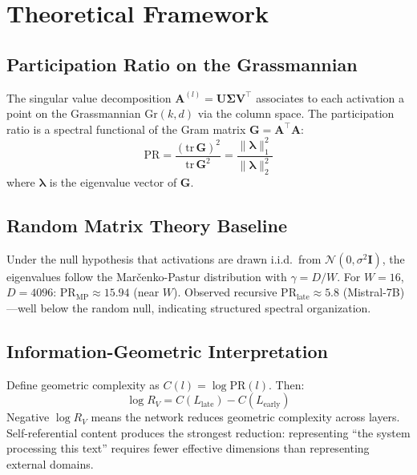 \documentclass{article}
\newcommand{\RV}{R_V}
\newcommand{\PR}{\text{PR}}
\begin{document}
\section{Theoretical Framework}
\label{app:theory}

\subsection{Participation Ratio on the Grassmannian}

The singular value decomposition $\mathbf{A}^{(l)} = \mathbf{U} \boldsymbol{\Sigma} \mathbf{V}^\top$
associates to each activation a point on the Grassmannian $\text{Gr}(k, d)$ via the column space.
The participation ratio is a spectral functional of the Gram matrix
$\mathbf{G} = \mathbf{A}^\top \mathbf{A}$:
\begin{equation}
    \PR = \frac{(\text{tr}\,\mathbf{G})^2}{\text{tr}\,\mathbf{G}^2} = \frac{\|\boldsymbol{\lambda}\|_1^2}{\|\boldsymbol{\lambda}\|_2^2}
\end{equation}
where $\boldsymbol{\lambda}$ is the eigenvalue vector of $\mathbf{G}$.

\subsection{Random Matrix Theory Baseline}

Under the null hypothesis that activations are drawn i.i.d.\ from
$\mathcal{N}(0, \sigma^2 \mathbf{I})$, the eigenvalues follow the
Mar\v{c}enko-Pastur distribution with $\gamma = D/W$.
For $W = 16$, $D = 4096$: $\PR_\mathrm{MP} \approx 15.94$ (near $W$).
Observed recursive $\PR_\mathrm{late} \approx 5.8$ (Mistral-7B)---well below the random null,
indicating structured spectral organization.

\subsection{Information-Geometric Interpretation}

Define geometric complexity as $C(l) = \log \PR(l)$. Then:
\begin{equation}
    \log \RV = C(L_\mathrm{late}) - C(L_\mathrm{early})
\end{equation}
Negative $\log \RV$ means the network reduces geometric complexity across layers.
Self-referential content produces the strongest reduction: representing ``the system processing
this text'' requires fewer effective dimensions than representing external domains.
\end{document}
